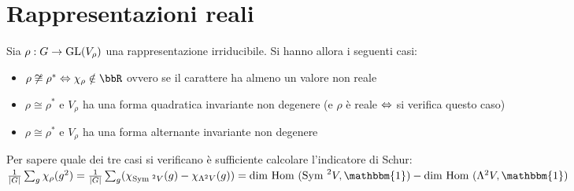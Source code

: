 \documentclass[a4paper,NoNotes,GeneralMath]{stdmdoc}
\newcommand{\Sym}{\text{Sym }}
\newcommand{\Hom}{\text{Hom }}
\begin{document}
	\section{Rappresentazioni reali}
	Sia $\rho: G \rightarrow \mbox{GL}(V_\rho)$ una rappresentazione irriducibile. Si hanno allora i seguenti casi:
	\begin{itemize}
		\item $\rho \not\cong \rho^{*} \sse \chi_\rho \notin \bbR$ ovvero se il carattere ha almeno un valore non reale
		\item $\rho \cong \rho^{*}$ e $V_\rho$ ha una forma quadratica invariante non degenere (e $\rho$ è reale $\Leftrightarrow$ si verifica questo caso)
		\item $\rho \cong \rho^{*}$ e $V_\rho$ ha una forma alternante invariante non degenere
	\end{itemize}
	Per sapere quale dei tre casi si verificano è sufficiente calcolare l'indicatore di Schur:
	$\frac{1}{\mid G \mid} \sum_g \chi_\rho(g^2) = \frac{1}{\mid G \mid} \sum_g (\chi_{\Sym^2 V}(g) - \chi_{\Lambda^2 V}(g)) = \Dim \Hom (\Sym^2 V, \mathbbm{1}) - \Dim \Hom (\Lambda^2 V, \mathbbm{1}) $
\end{document}
